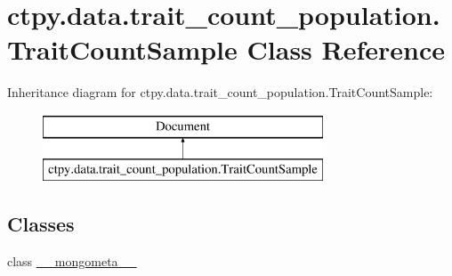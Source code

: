 \hypertarget{classctpy_1_1data_1_1trait__count__population_1_1_trait_count_sample}{\section{ctpy.\-data.\-trait\-\_\-count\-\_\-population.\-Trait\-Count\-Sample Class Reference}
\label{classctpy_1_1data_1_1trait__count__population_1_1_trait_count_sample}
}
Inheritance diagram for ctpy.\-data.\-trait\-\_\-count\-\_\-population.\-Trait\-Count\-Sample\-:\begin{figure}[H]
\begin{center}
\leavevmode
\includegraphics[height=2.000000cm]{classctpy_1_1data_1_1trait__count__population_1_1_trait_count_sample}
\end{center}
\end{figure}
\subsection*{Classes}
\begin{DoxyCompactItemize}
\item 
class \hyperlink{classctpy_1_1data_1_1trait__count__population_1_1_trait_count_sample_1_1____mongometa____}{\-\_\-\-\_\-mongometa\-\_\-\-\_\-}
\end{DoxyCompactItemize}
